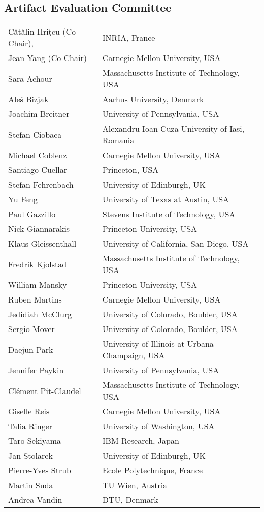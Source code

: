 \subsection*{\sffamily Artifact Evaluation Committee}

\begin{tabular}{@{}p{\namewidth}l@{}}
C\u{a}t\u{a}lin Hri\c{t}cu (Co-Chair),
  & INRIA, France \\
Jean Yang (Co-Chair)
  & Carnegie Mellon University, USA \\
Sara Achour
  & Massachusetts Institute of Technology, USA \\
Aleš Bizjak
  & Aarhus University, Denmark \\
Joachim Breitner
  & University of Pennsylvania, USA \\
Stefan Ciobaca
  & Alexandru Ioan Cuza University of Iasi, Romania \\
Michael Coblenz
  & Carnegie Mellon University, USA  \\
Santiago Cuellar
  & Princeton, USA \\
Stefan Fehrenbach
  & University of Edinburgh, UK \\
Yu Feng
  & University of Texas at Austin, USA \\
Paul Gazzillo
  & Stevens Institute of Technology, USA \\
Nick Giannarakis
  & Princeton University, USA \\
Klaus Gleissenthall
  & University of California, San Diego, USA \\
Fredrik Kjolstad
  & Massachusetts Institute of Technology, USA \\
William Mansky
  & Princeton University, USA \\
Ruben Martins
  & Carnegie Mellon University, USA \\
Jedidiah McClurg
  & University of Colorado, Boulder, USA \\
Sergio Mover
  & University of Colorado, Boulder, USA \\
Daejun Park
  & University of Illinois at Urbana-Champaign, USA \\
Jennifer Paykin
  & University of Pennsylvania, USA \\
Clément Pit-Claudel
  & Massachusetts Institute of Technology, USA \\
Giselle Reis
  & Carnegie Mellon University, USA \\
Talia Ringer
  & University of Washington, USA \\
Taro Sekiyama
  & IBM Research, Japan \\
Jan Stolarek
  & University of Edinburgh, UK  \\
Pierre-Yves Strub
  & Ecole Polytechnique, France \\
Martin Suda
  & TU Wien, Austria \\
Andrea Vandin
  & DTU, Denmark \\
\end{tabular}


\newpage
